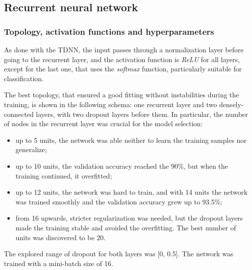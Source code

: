 \subsection{Recurrent neural network}
\subsubsection{Topology, activation functions and hyperparameters}
As done with the TDNN, the input passes through a normalization layer before going to the recurrent layer, and the activation function is \textit{ReLU} for all layers, except for the last one, that uses the \textit{softmax} function, particularly suitable for classification.
\bigbreak

The best topology, that ensured a good fitting without instabilities during the training, is shown in the following schema: one recurrent layer and two densely-connected layers, with two dropout layers before them. In particular, the number of nodes in the recurrent layer was crucial for the model selection:
\begin{itemize}
	\item up to 5 units, the network was able neither to learn the training samples nor generalize;
	\item up to 10 units, the validation accuracy reached the 90\%, but when the training continued, it overfitted;
	\item up to 12 units, the network was hard to train, and with 14 units the network was trained smoothly and the validation accuracy grew up to 93.5\%;
	\item from 16 upwards, stricter regularization was needed, but the dropout layers made the training stable and avoided the overfitting. The best number of units was discovered to be 20.
\end{itemize}
The explored range of dropout for both layers was [0, 0.5]. The network was trained with a mini-batch size of 16.

